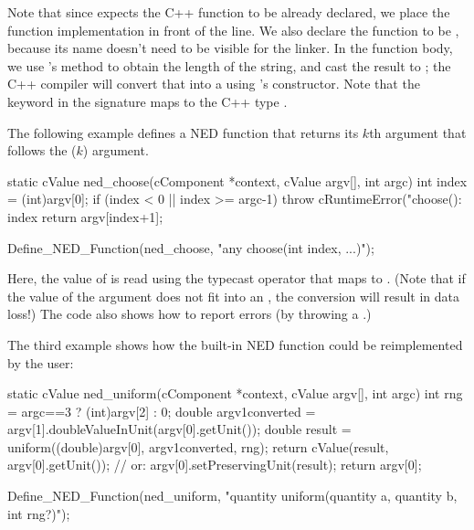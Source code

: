 Note that since  expects the C++ function to
be already declared, we place the function implementation in front of the
 line. We also declare the function to be
, because its name doesn't need to be visible for the linker.
In the function body, we use 's  method to
obtain the length of the string, and cast the result to ; the C++
compiler will convert that into a  using 's
 constructor. Note that the  keyword in the signature
maps to the C++ type .

The following example defines a  NED function that returns
its $k$th argument that follows the  ($k$) argument.

\begin{cpp}
static cValue ned_choose(cComponent *context, cValue argv[], int argc)
{
    int index = (int)argv[0];
    if (index < 0 || index >= argc-1)
        throw cRuntimeError("choose(): index %
    return argv[index+1];
}

Define_NED_Function(ned_choose, "any choose(int index, ...)");
\end{cpp}

Here, the value of  is read using the typecast operator that
maps to . (Note that if the value of the 
argument does not fit into an , the conversion will result
in data loss!) The code also shows how to report errors (by throwing a
.)

The third example shows how the built-in  NED function could
be reimplemented by the user:

\begin{cpp}
static cValue ned_uniform(cComponent *context, cValue argv[], int argc)
{
    int rng = argc==3 ? (int)argv[2] : 0;
    double argv1converted = argv[1].doubleValueInUnit(argv[0].getUnit());
    double result = uniform((double)argv[0], argv1converted, rng);
    return cValue(result, argv[0].getUnit());
    // or: argv[0].setPreservingUnit(result); return argv[0];
}

Define_NED_Function(ned_uniform, "quantity uniform(quantity a, quantity b, int rng?)");
\end{cpp}

